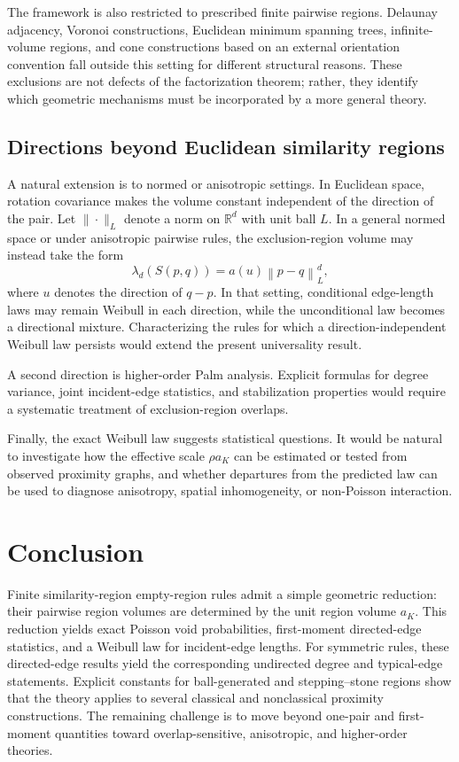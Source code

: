 \documentclass[a4paper,fleqn]{cas-dc}
\numberwithin{equation}{section}
\newcommand{\1}{\mathds{1}}
\newcommand{\norm}[1]{\left\lVert #1\right\rVert}
\newcommand{\0}{\mathbf{0}}
\begin{document}
The framework is also restricted to prescribed finite pairwise regions. Delaunay adjacency, Voronoi constructions, Euclidean minimum spanning trees, infinite-volume regions, and cone constructions based on an external orientation convention fall outside this setting for different structural reasons. These exclusions are not defects of the factorization theorem; rather, they identify which geometric mechanisms must be incorporated by a more general theory.

\subsection{Directions beyond Euclidean similarity regions}
A natural extension is to normed or anisotropic settings. In Euclidean space, rotation covariance makes the volume constant independent of the direction of the pair.
Let \(\|\cdot\|_L\) denote a norm on \(\mathbb{R}^d\) with unit ball
\(L\).
In a general normed space or under anisotropic pairwise rules, the exclusion-region volume may instead take the form
\begin{equation}\label{eq:anisotropic-volume-direction}
\lambda_d(S(p,q)) = a(u)\norm{p-q}_L^d,
\end{equation}
where $u$ denotes the direction of $q-p$. In that setting, conditional edge-length laws may remain Weibull in each direction, while the unconditional law becomes a directional mixture. Characterizing the rules for which a direction-independent Weibull law persists would extend the present universality result.

A second direction is higher-order Palm analysis. Explicit formulas for degree variance, joint incident-edge statistics, and stabilization properties would require a systematic treatment of exclusion-region overlaps. 

Finally, the exact Weibull law suggests statistical questions. It would be natural to investigate how the effective scale \(\rho a_K\) can be estimated or tested from observed proximity graphs, and whether departures from the predicted law can be used to diagnose anisotropy, spatial inhomogeneity, or non-Poisson interaction.


\section{Conclusion}\label{sec:conclusion}
Finite similarity-region empty-region rules admit a simple geometric
reduction: their pairwise region volumes are determined by the unit
region volume \(a_K\). This reduction yields exact Poisson void
probabilities, first-moment directed-edge statistics, and a Weibull law
for incident-edge lengths. For symmetric rules, these directed-edge
results yield the corresponding undirected degree and typical-edge
statements. Explicit constants
for ball-generated and stepping--stone regions show that the theory
applies to several classical and nonclassical proximity constructions.
The remaining challenge is to move beyond one-pair and first-moment quantities
toward overlap-sensitive, anisotropic, and higher-order theories.
\end{document}
